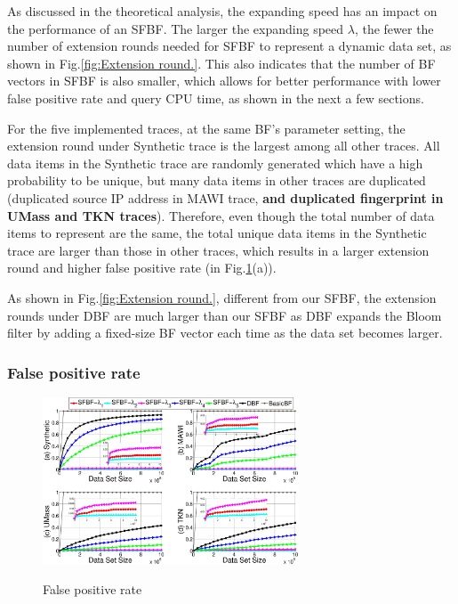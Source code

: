 \documentclass[10pt,journal,compsoc]{IEEEtran}
\newcommand{\rev}[1]{#1}
\newcommand{\note}[1]{{\sffamily\itshape\bfseries\uline{#1}}}
\begin{document}
As discussed in the theoretical analysis, the expanding speed has an impact on the performance of an SFBF. The larger the expanding speed $\lambda$, the fewer the number of extension rounds needed for SFBF to represent a dynamic data set, as shown in Fig.\ref{fig:Extension round.}. This also indicates that the number of BF vectors in SFBF is also smaller, which allows for better performance with lower false positive rate and query CPU time, as shown in the next a few sections.

For the five implemented traces, at the same BF's parameter setting, the extension round under Synthetic trace is the largest among all other traces. All data items in the Synthetic trace are randomly generated which have a high probability to be unique, but many data items in other traces are duplicated (duplicated source IP address in  MAWI trace, \textbf{and duplicated fingerprint in UMass and TKN traces}). Therefore, even though the total number of data items to represent are the same, the total unique data items in the Synthetic trace are larger than those in other traces, which results in a larger extension round and higher false positive rate (in Fig.\ref{fig:False positive rate.}(a)).

As shown in Fig.\ref{fig:Extension round.}, different from our SFBF, \rev{the extension rounds under DBF are much larger than our SFBF as DBF expands the Bloom filter by adding a fixed-size BF vector each time as the data set becomes larger.}





\subsubsection{False positive rate}

\begin{figure}[!h]
\center
\includegraphics[width=3in]{franztao20161209/p1_falsepositiverate}\\
\caption{False positive rate}
\label{fig:False positive rate.}
\end{figure}
\end{document}
